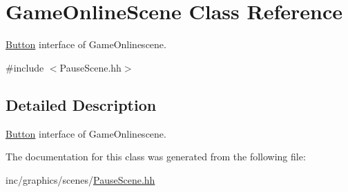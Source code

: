 \hypertarget{classGameOnlineScene}{}\section{Game\+Online\+Scene Class Reference}
\label{classGameOnlineScene}


\hyperlink{classButton}{Button} interface of Game\+Onlinescene.  




{\ttfamily \#include $<$Pause\+Scene.\+hh$>$}



\subsection{Detailed Description}
\hyperlink{classButton}{Button} interface of Game\+Onlinescene. 

The documentation for this class was generated from the following file\+:\begin{DoxyCompactItemize}
\item 
inc/graphics/scenes/\hyperlink{PauseScene_8hh}{Pause\+Scene.\+hh}\end{DoxyCompactItemize}
